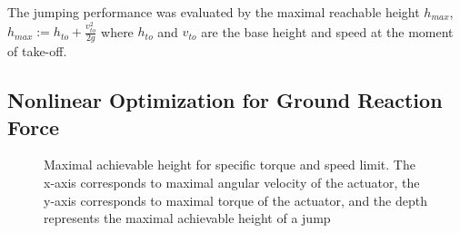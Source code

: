The jumping performance was evaluated by the maximal reachable height $h_{max}$, $h_{max} := h_{to}+\frac{v_{to}^2}{2g}$ where $h_{to}$ and $v_{to}$ are the base height and speed at the moment of take-off.


\subsection{Nonlinear Optimization for Ground Reaction Force}
\label{sec:nonlOptGRF}

\begin{figure}
	\centering
	\caption{Maximal achievable height for specific torque and speed limit. The x-axis corresponds to maximal angular velocity of the actuator, the y-axis corresponds to maximal torque of the actuator, and the depth represents the maximal achievable height of a jump}
	\label{fig:hmax_pcolor}
\end{figure}




